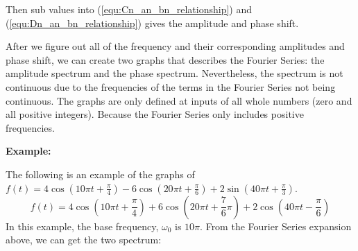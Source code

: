 Then sub values into ({\ref{equ:Cn_an_bn_relationship}}) and ({\ref{equ:Dn_an_bn_relationship}}) 
gives the amplitude and phase shift.

After we figure out all of the frequency and their corresponding amplitudes and phase shift, we can create two graphs that describes the Fourier Series: the amplitude spectrum and the phase spectrum.
Nevertheless, the spectrum is not continuous due to the frequencies of 
the terms in the Fourier Series not being continuous. The graphs are only defined at inputs of all whole numbers (zero and all positive integers). Because the Fourier Series only includes positive frequencies.
\vspace{1pc}

\noindent\textbf{Example:}

The following is an example of the graphs of 
$f(t) = 4\cos(10\pi t+\frac{\pi}{4}) - 6\cos(20\pi t+\frac{\pi}{6}) + 2\sin(40\pi t+\frac{\pi}{3})$.
$$f(t)= 4\cos(10\pi t+\frac{\pi}{4}) + 6\cos(20\pi t+\frac{7}{6}\pi) + 2\cos(40\pi t-\frac{\pi}{6})$$
\indent In this example, the base frequency, $\omega_0$ is $10\pi$.
From the Fourier Series expansion above, we can get the two spectrum:

